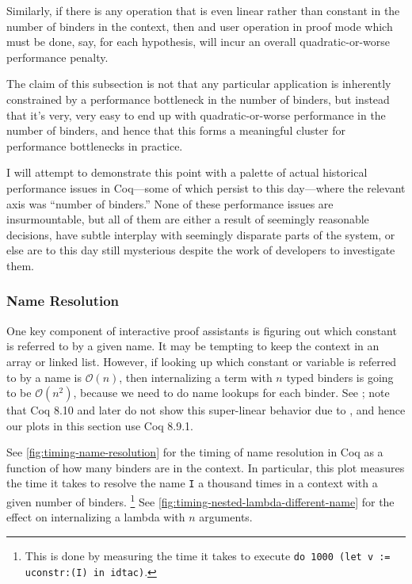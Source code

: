 
Similarly, if there is any operation that is even linear rather than constant in the number of binders in the context, then and user operation in proof mode which must be done, say, for each hypothesis, will incur an overall quadratic-or-worse performance penalty.

The claim of this subsection is not that any particular application is inherently constrained by a performance bottleneck in the number of binders, but instead that it's very, very easy to end up with quadratic-or-worse performance in the number of binders, and hence that this forms a meaningful cluster for performance bottlenecks in practice.

I will attempt to demonstrate this point with a palette of actual historical performance issues in Coq---some of which persist to this day---where the relevant axis was ``number of binders.''
None of these performance issues are insurmountable, but all of them are either a result of seemingly reasonable decisions, have subtle interplay with seemingly disparate parts of the system, or else are to this day still mysterious despite the work of developers to investigate them.

\subsubsection{Name Resolution} \label{sec:name-resolution}
One key component of interactive proof assistants is figuring out which constant is referred to by a given name.
It may be tempting to keep the context in an array or linked list.
However, if looking up which constant or variable is referred to by a name is $\mathcal O(n)$, then internalizing a term with $n$ typed binders is going to be $\mathcal O(n^2)$, because we need to do name lookups for each binder.
See ; note that Coq 8.10 and later do not show this super-linear behavior due to , and hence our plots in this section use Coq 8.9.1.

See \autoref{fig:timing-name-resolution} for the timing of name resolution in Coq as a function of how many binders are in the context.
In particular, this plot measures the time it takes to resolve the name \texttt{I} a thousand times in a context with a given number of binders.%
\footnote{%
  This is done by measuring the time it takes to execute \texttt{do 1000 (let v := uconstr:(I) in idtac)}.
}
See \autoref{fig:timing-nested-lambda-different-name} for the effect on internalizing a lambda with $n$ arguments.

